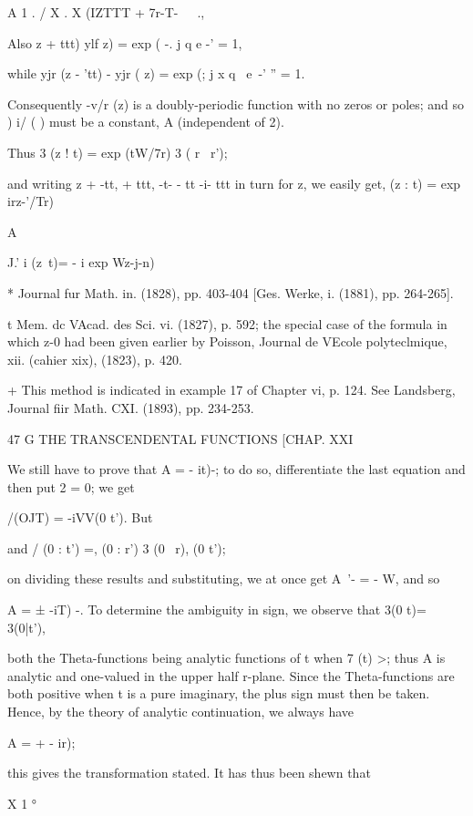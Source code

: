 A 1 . / X . X (IZTTT + 7r-T-\ \ \ .,

Also z + ttt) ylf z) = exp ( -. j q e -' = 1,

while yjr (z - 'tt) - yjr ( z) = exp (; j x q~ e~-' '' = 1.

Consequently -v/r (z) is a doubly-periodic function with no zeros or
poles; and so ) i/ ( ) must be a constant, A (independent of
2).

Thus 3 (z ! t) = exp (tW/7r) 3 ( r \ r');

and writing z + -tt, + ttt, -t- - tt -i- ttt in turn for z, we easily
get, (z : t) = exp irz-'/Tr) %

A%

J.' i (z\ t)= - i exp Wz-j-n) %

* Journal fur Math. in. (1828), pp. 403-404 [Ges. Werke, i. (1881),
pp. 264-265].

t Mem. dc VAcad. des Sci. vi. (1827), p. 592; the special case of the
formula in which z-0 had been given earlier by Poisson, Journal de
VEcole polyteclmique, xii. (cahier xix), (1823), p. 420.

+ This method is indicated in example 17 of Chapter vi, p. 124. See
Landsberg, Journal fiir Math. CXI. (1893), pp. 234-253.

47 G THE TRANSCENDENTAL FUNCTIONS [CHAP. XXI

We still have to prove that A = - it)-; to do so, differentiate the
last equation and then put 2 = 0; we get

 /(OJT) = -iVV(0 t'). But %

and / (0 : t') =, (0 : r') 3 (0 \ r), (0 t');

on dividing these results and substituting, we at once get A~'- = - W,
and so

A = ± -iT) -. To determine the ambiguity in sign, we observe that 3(0
t)= 3(0|t'),

both the Theta-functions being analytic functions of t when 7 (t) >;
thus A is analytic and one-valued in the upper half r-plane. Since the
Theta-functions are both positive when t is a pure imaginary, the plus
sign must then be taken. Hence, by the theory of analytic
continuation, we always have

A = + - ir);

this gives the transformation stated. It has thus been shewn that

X 1 °

